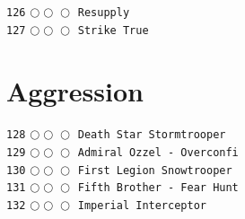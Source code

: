 \documentclass[a4paper,landscape]{article}
\begin{document}
\begin{multicols*}{5}
\texttt{126} \(\bigcirc\!\bigcirc\!\bigcirc\)  \texttt{Resupply} \vspace{-0.3mm}\\ 
\texttt{127} \(\bigcirc\!\bigcirc\!\bigcirc\)  \texttt{Strike True} \vspace{-0.3mm}\\ 
\section{Aggression} 
\vspace{-2mm} 
\texttt{128} \(\bigcirc\!\bigcirc\!\bigcirc\)  \texttt{Death Star Stormtrooper} \vspace{-0.3mm}\\ 
\texttt{129} \(\bigcirc\!\bigcirc\!\bigcirc\)  \texttt{Admiral Ozzel - Overconfi} \vspace{-0.3mm}\\ 
\texttt{130} \(\bigcirc\!\bigcirc\!\bigcirc\)  \texttt{First Legion Snowtrooper} \vspace{-0.3mm}\\ 
\texttt{131} \(\bigcirc\!\bigcirc\!\bigcirc\)  \texttt{Fifth Brother - Fear Hunt} \vspace{-0.3mm}\\ 
\texttt{132} \(\bigcirc\!\bigcirc\!\bigcirc\)  \texttt{Imperial Interceptor} \vspace{-0.3mm}\\ 

\end{multicols*}
\end{document}
